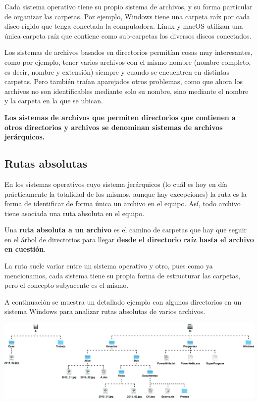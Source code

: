 Cada sistema operativo tiene su propio sistema de archivos, y su forma
particular de organizar las carpetas. Por ejemplo, Windows tiene una carpeta
raíz por cada disco rígido que tenga conectada la computadora. Linux y macOS
utilizan una única carpeta raíz que contiene como sub-carpetas los diversos
discos conectados.

Los sistemas de archivos basados en directorios permitían cosas muy
interesantes, como por ejemplo, tener varios archivos con el mismo nombre
(nombre completo, es decir, nombre y extensión) siempre y cuando se encuentren
en distintas carpetas. Pero también traían aparejados otros problemas, como que
ahora los archivos no son identificables mediante solo su nombre, sino mediante
el nombre y la carpeta en la que se ubican.

\textbf{Los sistemas de archivos que permiten directorios que contienen a otros
directorios y archivos se denominan sistemas de archivos jerárquicos.}

\subsection{Rutas absolutas}
\label{chap:informatica:subsec:rutas_absolutas}

En los sistemas operativos cuyo sistema jerárquicos (lo cuál es hoy en día
prácticamente la totalidad de los mismos, aunque hay excepciones) la ruta es la
forma de identificar de forma única un archivo en el equipo. Así, todo archivo
tiene asociada una ruta absoluta en el equipo.

\begin{definition}
    Una \textbf{ruta absoluta a un archivo} es el camino de carpetas que hay que
    seguir en el árbol de directorios para llegar \textbf{desde el directorio
    raíz hasta el archivo en cuestión}.\autocite[vid.]{foldoc_absolute_2018}
\end{definition}

La ruta suele variar entre un sistema operativo y otro, pues como ya
mencionamos, cada sistema tiene su propia forma de estructurar las carpetas,
pero el concepto subyacente es el mismo.

A continuación se muestra un detallado ejemplo con algunos directorios en un
sistema Windows para analizar rutas absolutas de varios archivos.

\vspace{0.5cm}
\centerline{\includegraphics[scale=0.35]{unidades/2_informacion/2_informatica/imagenes/directorios_windows_1.png}}

